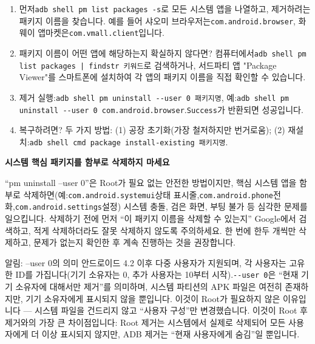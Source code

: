 \begin{enumerate}
  \item 먼저\texttt{adb shell pm list packages -\allowbreak s}로 모든 시스템 앱을 나열하고, 제거하려는 패키지 이름을 찾습니다. 예를 들어 샤오미 브라우저는\texttt{com.\allowbreak android.\allowbreak browser}, 화웨이 앱마켓은\texttt{com.\allowbreak vmall.\allowbreak client}입니다.
  \item 패키지 이름이 어떤 앱에 해당하는지 확실하지 않다면? 컴퓨터에서\texttt{adb shell pm list packages | findstr 키워드}로 검색하거나, 서드파티 앱 "Package Viewer"를 스마트폰에 설치하여 각 앱의 패키지 이름을 직접 확인할 수 있습니다.
  \item 제거 실행:\texttt{adb shell pm uninstall -\allowbreak -\allowbreak user 0 패키지명}, 예:\texttt{adb shell pm uninstall -\allowbreak -\allowbreak user 0 com.\allowbreak android.\allowbreak browser}.\texttt{Success}가 반환되면 성공입니다.
  \item 복구하려면? 두 가지 방법: (1) 공장 초기화(가장 철저하지만 번거로움); (2) 재설치:\texttt{adb shell cmd package install-\allowbreak existing 패키지명}.
\end{enumerate}

\textbf{시스템 핵심 패키지를 함부로 삭제하지 마세요}\par

“pm uninstall --user 0”은 Root가 필요 없는 안전한 방법이지만, 핵심 시스템 앱을 함부로 삭제하면(예:\texttt{com.\allowbreak android.\allowbreak systemui}상태 표시줄,\texttt{com.\allowbreak android.\allowbreak phone}전화,\texttt{com.\allowbreak android.\allowbreak settings}설정) 시스템 충돌, 검은 화면, 부팅 불가 등 심각한 문제를 일으킵니다. 삭제하기 전에 먼저 “이 패키지 이름을 삭제할 수 있는지” Google에서 검색하고, 적게 삭제하더라도 잘못 삭제하지 않도록 주의하세요. 한 번에 한두 개씩만 삭제하고, 문제가 없는지 확인한 후 계속 진행하는 것을 권장합니다.

\begin{tcbinfo}{알림: --user 0의 의미}
안드로이드 4.2 이후 다중 사용자가 지원되며, 각 사용자는 고유한 ID를 가집니다(기기 소유자는 0, 추가 사용자는 10부터 시작).\texttt{-\allowbreak -\allowbreak user 0}은 “현재 기기 소유자에 대해서만 제거”를 의미하며, 시스템 파티션의 APK 파일은 여전히 존재하지만, 기기 소유자에게 표시되지 않을 뿐입니다. 이것이 Root가 필요하지 않은 이유입니다 — 시스템 파일을 건드리지 않고 “사용자 구성”만 변경했습니다. 이것이 Root 후 제거와의 가장 큰 차이점입니다: Root 제거는 시스템에서 실제로 삭제되어 모든 사용자에게 더 이상 표시되지 않지만, ADB 제거는 “현재 사용자에게 숨김”일 뿐입니다.

\end{tcbinfo}

